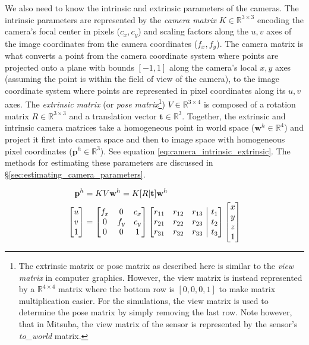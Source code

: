 \documentclass[11pt, letterpaper]{extarticle} %
\begin{document}
We also need to know the intrinsic and extrinsic parameters of the cameras. The intrinsic parameters are represented by the \textit{camera matrix} $K \in \mathbb{R}^{3 \times 3}$ encoding the camera's focal center in pixels ($c_x, c_y$) and scaling factors along the $u, v$ axes of the image coordinates from the camera coordinates ($f_x, f_y$). The camera matrix is what converts a point from the camera coordinate system where points are projected onto a plane with bounds $[-1, 1]$ along the camera's local $x, y$ axes (assuming the point is within the field of view of the camera), to the image coordinate system where points are represented in pixel coordinates along its $u, v$ axes. The \textit{extrinsic matrix} (or \textit{pose matrix}\footnote{The extrinsic matrix or pose matrix as described here is similar to the \textit{view matrix} in computer graphics. However, the view matrix is instead represented by a $\mathbb{R}^{4 \times 4}$ matrix where the bottom row is $[0,0,0,1]$ to make matrix multiplication easier. For the simulations, the view matrix is used to determine the pose matrix by simply removing the last row. Note however, that in Mitsuba, the view matrix of the sensor is represented by the sensor's \textit{to\_world} matrix.}) $V \in \mathbb{R}^{3 \times 4}$ is composed of a rotation matrix $R \in \mathbb{R}^{3 \times 3}$ and a translation vector $\mathbf{t} \in \mathbb{R}^{3}$. Together, the extrinsic and intrinsic camera matrices take a homogeneous point in world space ($\mathbf{w}^h \in \mathbb{R}^{4}$) and project it first into camera space and then to image space with homogeneous pixel coordinates ($\mathbf{p}^h \in \mathbb{R}^{3}$). See equation \ref{eq:camera_intrinsic_extrinsic}. The methods for estimating these parameters are discussed in \S\ref{sec:estimating_camera_parameters}.

\begin{align} 
    \label{eq:camera_intrinsic_extrinsic}
    \mathbf{p}^h &= K V \mathbf{w}^h = K [R|\mathbf{t}] \mathbf{w}^h \\
    \label{eq:camera_intrinsic_extrinsic_expanded}
    \begin{bmatrix} 
        u \\ v \\ 1 
    \end{bmatrix}     
    &= 
    \begin{bmatrix}
        f_x & 0 & c_x \\
        0 & f_y & c_y \\
        0 & 0 & 1
    \end{bmatrix}
    \left[ 
    \begin{array}{@{}ccc|c@{}}
        r_{11} & r_{12} & r_{13} & t_1 \\
        r_{21} & r_{22} & r_{23} & t_2 \\
        r_{31} & r_{32} & r_{33} & t_3
    \end{array}
    \right]
    \begin{bmatrix} 
        x \\ y \\ z \\ 1
    \end{bmatrix}
\end{align}
\end{document}
